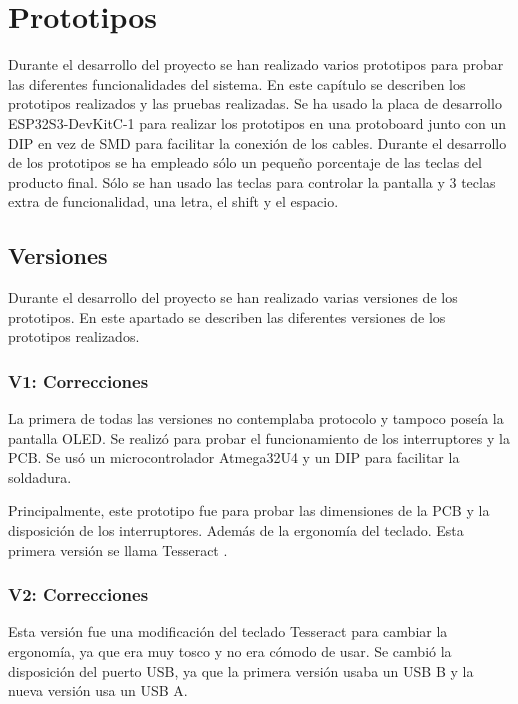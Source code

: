 \chapter{Prototipos}

Durante el desarrollo del proyecto se han realizado varios prototipos para probar las diferentes funcionalidades del sistema. En este capítulo se describen los prototipos realizados y las pruebas realizadas. Se ha usado la placa de desarrollo ESP32S3-DevKitC-1 para realizar los prototipos en una protoboard junto con un  DIP en vez de \gls{SMD} para facilitar la conexión de los cables. Durante el desarrollo de los prototipos se ha empleado sólo un pequeño porcentaje de las teclas del producto final. Sólo se han usado las teclas para controlar la pantalla y 3 teclas extra de funcionalidad, una letra, el shift y el espacio.


\section{Versiones}
Durante el desarrollo del proyecto se han realizado varias versiones de los prototipos. En este apartado se describen las diferentes versiones de los prototipos realizados.

\subsection{V1: Correcciones}
La primera de todas las versiones no contemplaba protocolo  y tampoco poseía la pantalla \gls{OLED}. Se realizó para probar el funcionamiento de los interruptores y la \gls{PCB}. Se usó un microcontrolador Atmega32U4 y un  DIP para facilitar la soldadura.

Principalmente, este prototipo fue para probar las dimensiones de la \gls{PCB} y la disposición de los interruptores. Además de la ergonomía del teclado. Esta primera versión se llama Tesseract \cite{Tesseract}.

\subsection{V2: Correcciones}
Esta versión fue una modificación del teclado Tesseract \cite{Tesseract} para cambiar la ergonomía, ya que era muy tosco y no era cómodo de usar. Se cambió la disposición del puerto \gls{USB}, ya que la primera versión usaba un \gls{USB} B y la nueva versión usa un \gls{USB} A.

